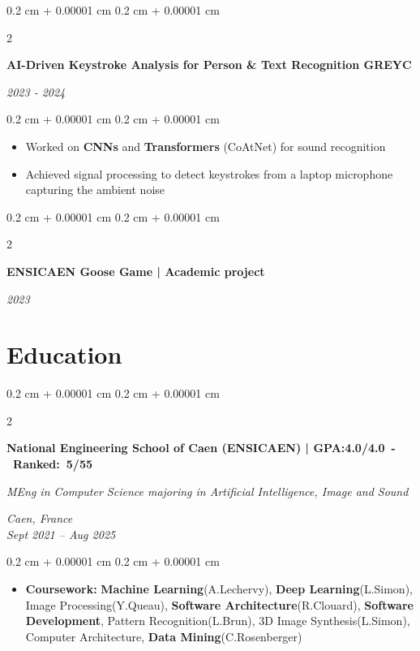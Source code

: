 \documentclass[10pt, letterpaper]{article}
\newenvironment{highlights}{
    \begin{itemize}[
        topsep=0.10 cm,
        parsep=0.10 cm,
        partopsep=0pt,
        itemsep=0pt,
        leftmargin=0.4 cm + 10pt
    ]
}{
    \end{itemize}
} %
\newenvironment{onecolentry}{
    \begin{adjustwidth}{
        0.2 cm + 0.00001 cm
    }{
        0.2 cm + 0.00001 cm
    }
}{
    \end{adjustwidth}
} %
\newenvironment{twocolentry}[2][]{
    \onecolentry
    \def\secondColumn{#2}
    \setcolumnwidth{\fill, 4.5 cm}
    \begin{paracol}{2}
}{
    \switchcolumn \raggedleft \secondColumn
    \end{paracol}
    \endonecolentry
} %
\begin{document}
        \vspace{0.1 cm}

        \begin{twocolentry}{
            
            
        \textit{2023 - 2024}}
            \textbf{AI-Driven Keystroke Analysis for Person \& Text Recognition \textcolor{clearblue}{GREYC}}
        \end{twocolentry}

        \vspace{0.10 cm}
        \begin{onecolentry}
            \begin{highlights}
                \item Worked on \textbf{CNNs} and \textbf{Transformers} (CoAtNet) for sound recognition 
                \item Achieved signal processing to detect keystrokes from a laptop microphone capturing the ambient noise
            \end{highlights}
        \end{onecolentry}

        \vspace{0.1 cm}

        \begin{twocolentry}{
            
            
        \textit{2023}}
            \textbf{ENSICAEN Goose Game | \textcolor{clearblue}{Academic project}}
        \end{twocolentry}

     \section{Education}

        \begin{twocolentry}{
            
        \textit{Caen, France}\\
        \textit{Sept 2021 – Aug 2025}}
            \textbf{National Engineering School of Caen \textcolor{clearblue}{(ENSICAEN)} | \mbox{GPA:4.0/4.0 - Ranked: 5/55}}

            \textit{MEng in Computer Science majoring in Artificial Intelligence, Image and Sound}
        \end{twocolentry}

        \vspace{0.10 cm}
        \begin{onecolentry}
            \begin{highlights}
                \item \textbf{Coursework:} \textbf{Machine Learning}(A.Lechervy), \textbf{Deep Learning}(L.Simon), Image Processing(Y.Queau), \textbf{Software Architecture}(R.Clouard), \textbf{Software Development}, Pattern Recognition(L.Brun), 3D Image Synthesis(L.Simon), Computer Architecture, \textbf{Data Mining}(C.Rosenberger) 
            \end{highlights}
        \end{onecolentry}
                \vspace{0.10 cm}
\end{document}
